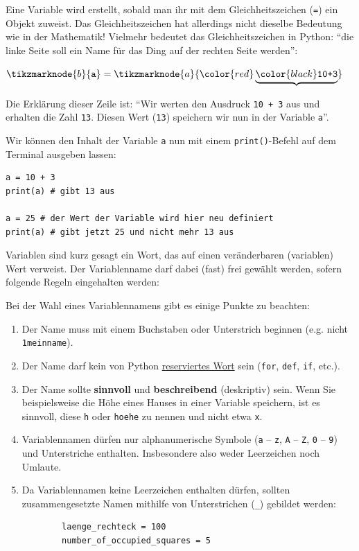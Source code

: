 Eine Variable wird erstellt, sobald man ihr mit dem Gleichheitszeichen (\lstinline|=|) ein Objekt zuweist. Das Gleichheitszeichen hat allerdings nicht dieselbe Bedeutung wie in der Mathematik! Vielmehr bedeutet das Gleichheitszeichen in Python: \enquote{die linke Seite soll ein Name für das Ding auf der rechten Seite werden}:
\begin{center}
	$ \tikzmarknode{b}{\text{\texttt{a}}} =\tikzmarknode{a}{\color{red}\underbrace{\color{black}\text{\texttt{10+3}}}}$
\end{center}

Die Erklärung dieser Zeile ist: \enquote{Wir werten den Ausdruck \lstinline|10 + 3| aus und erhalten die Zahl \lstinline|13|. Diesen Wert (\lstinline|13|) speichern wir nun in der Variable \lstinline|a|}.

Wir können den Inhalt der Variable \lstinline|a| nun mit einem \lstinline|print()|-Befehl auf dem Terminal ausgeben lassen:

\begin{lstlisting}
a = 10 + 3
print(a) # gibt 13 aus

a = 25 # der Wert der Variable wird hier neu definiert
print(a) # gibt jetzt 25 und nicht mehr 13 aus
\end{lstlisting}

Variablen sind kurz gesagt ein Wort, das auf einen veränderbaren (variablen) Wert verweist. Der Variablenname darf dabei (fast) frei gewählt werden, sofern folgende Regeln eingehalten werden:

\begin{myoverview}
	Bei der Wahl eines Variablennamens gibt es einige Punkte zu beachten:
	\begin{enumerate}
		\item Der Name muss mit einem Buchstaben oder Unterstrich beginnen (e.g. nicht \verb|1meinname|).
		\item Der Name darf kein von Python \href{https://www.programiz.com/python-programming/keyword-list}{reserviertes Wort} sein (\lstinline|for|, \lstinline|def|, \lstinline|if|, etc.).
		\item Der Name sollte \textbf{sinnvoll} und \textbf{beschreibend} (deskriptiv) sein. Wenn Sie beispielsweise die Höhe eines Hauses in einer Variable speichern, ist es sinnvoll, diese \lstinline|h| oder \lstinline|hoehe| zu nennen und nicht etwa \lstinline|x|.
		\item Variablennamen dürfen nur alphanumerische Symbole (\texttt{a} -- \texttt{z}, \texttt{A} -- \texttt{Z}, \texttt{0} -- \texttt{9}) und Unterstriche enthalten. Insbesondere also weder Leerzeichen noch Umlaute.
		\item Da Variablennamen keine Leerzeichen enthalten dürfen, sollten zusammengesetzte Namen mithilfe von Unterstrichen (\lstinline{_}) gebildet werden:
		      \begin{lstlisting}
		laenge_rechteck = 100
		number_of_occupied_squares = 5
		\end{lstlisting}
	\end{enumerate}
\end{myoverview}

